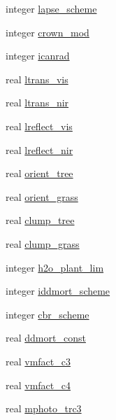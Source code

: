 \begin{DoxyCompactItemize}
integer \hyperlink{structename__coms_1_1ename__vars_a0eba66c49617006e18128906fd6f67a2}{lapse\+\_\+scheme}
\item 
integer \hyperlink{structename__coms_1_1ename__vars_a58c87ae48d40aeee5d14c66d860b1806}{crown\+\_\+mod}
\item 
integer \hyperlink{structename__coms_1_1ename__vars_a57302355a527893f058ddb0b3720279a}{icanrad}
\item 
real \hyperlink{structename__coms_1_1ename__vars_a2d04844b5dada78fe889ed5c22a7dcf7}{ltrans\+\_\+vis}
\item 
real \hyperlink{structename__coms_1_1ename__vars_a32f0cd6c80465307a6917165d1fff1ef}{ltrans\+\_\+nir}
\item 
real \hyperlink{structename__coms_1_1ename__vars_a0d35a96e4daec1a464e00f11bade25a6}{lreflect\+\_\+vis}
\item 
real \hyperlink{structename__coms_1_1ename__vars_a754f9d5509575c5d1a14549fcfd8549e}{lreflect\+\_\+nir}
\item 
real \hyperlink{structename__coms_1_1ename__vars_a91e00c074b3bf9b772303748a969b345}{orient\+\_\+tree}
\item 
real \hyperlink{structename__coms_1_1ename__vars_aa4f05a19aab14f9420eeba211f99c825}{orient\+\_\+grass}
\item 
real \hyperlink{structename__coms_1_1ename__vars_a8a516278fcc6b53d8a08d9c527cccf1f}{clump\+\_\+tree}
\item 
real \hyperlink{structename__coms_1_1ename__vars_aadac0a14412f0f1bd1eb276b5a4fd9ed}{clump\+\_\+grass}
\item 
integer \hyperlink{structename__coms_1_1ename__vars_abaa1414c56338c4ede0b94ba291e3ef0}{h2o\+\_\+plant\+\_\+lim}
\item 
integer \hyperlink{structename__coms_1_1ename__vars_aba4ea4fe46476acb7a80b29ec44e6dfd}{iddmort\+\_\+scheme}
\item 
integer \hyperlink{structename__coms_1_1ename__vars_a523fed3cc330ce833b0778a13349f832}{cbr\+\_\+scheme}
\item 
real \hyperlink{structename__coms_1_1ename__vars_a77b547475fb9f18985e6075af13514bc}{ddmort\+\_\+const}
\item 
real \hyperlink{structename__coms_1_1ename__vars_a824d9752aa9667789e0e9b25c1565790}{vmfact\+\_\+c3}
\item 
real \hyperlink{structename__coms_1_1ename__vars_a2f01234a00dc942fb411cb76aede6b9b}{vmfact\+\_\+c4}
\item 
real \hyperlink{structename__coms_1_1ename__vars_af8c77a6709812eae30c4e3412f716a84}{mphoto\+\_\+trc3}

\end{DoxyCompactItemize}

